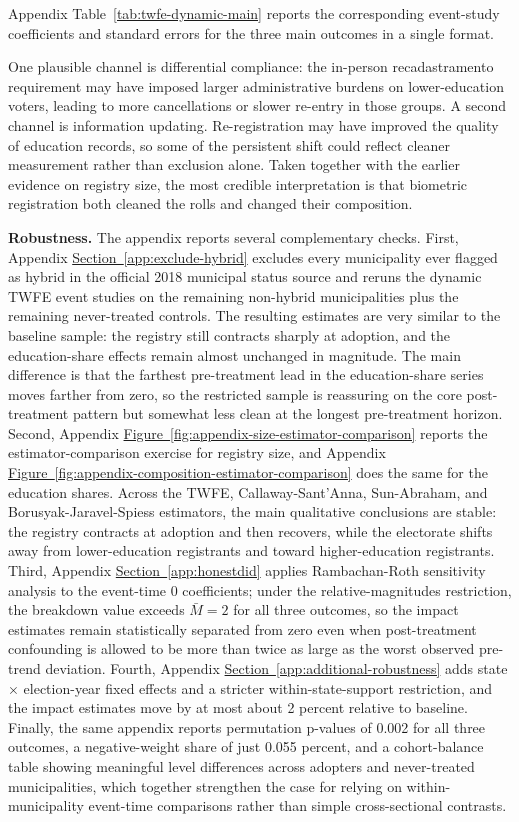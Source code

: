 Appendix Table~\ref{tab:twfe-dynamic-main} reports the corresponding event-study coefficients and standard errors for the three main outcomes in a single format.

One plausible channel is differential compliance: the in-person recadastramento requirement may have imposed larger administrative burdens on lower-education voters, leading to more cancellations or slower re-entry in those groups. A second channel is information updating. Re-registration may have improved the quality of education records, so some of the persistent shift could reflect cleaner measurement rather than exclusion alone. Taken together with the earlier evidence on registry size, the most credible interpretation is that biometric registration both cleaned the rolls and changed their composition.

\textbf{Robustness.} The appendix reports several complementary checks. First, Appendix \hyperref[app:exclude-hybrid]{Section~\ref*{app:exclude-hybrid}} excludes every municipality ever flagged as hybrid in the official 2018 municipal status source and reruns the dynamic TWFE event studies on the remaining non-hybrid municipalities plus the remaining never-treated controls. The resulting estimates are very similar to the baseline sample: the registry still contracts sharply at adoption, and the education-share effects remain almost unchanged in magnitude. The main difference is that the farthest pre-treatment lead in the education-share series moves farther from zero, so the restricted sample is reassuring on the core post-treatment pattern but somewhat less clean at the longest pre-treatment horizon. Second, Appendix \hyperref[fig:appendix-size-estimator-comparison]{Figure~\ref*{fig:appendix-size-estimator-comparison}} reports the estimator-comparison exercise for registry size, and Appendix \hyperref[fig:appendix-composition-estimator-comparison]{Figure~\ref*{fig:appendix-composition-estimator-comparison}} does the same for the education shares. Across the TWFE, Callaway-Sant'Anna, Sun-Abraham, and Borusyak-Jaravel-Spiess estimators, the main qualitative conclusions are stable: the registry contracts at adoption and then recovers, while the electorate shifts away from lower-education registrants and toward higher-education registrants. Third, Appendix \hyperref[app:honestdid]{Section~\ref*{app:honestdid}} applies Rambachan-Roth sensitivity analysis to the event-time $0$ coefficients; under the relative-magnitudes restriction, the breakdown value exceeds $\bar{M}=2$ for all three outcomes, so the impact estimates remain statistically separated from zero even when post-treatment confounding is allowed to be more than twice as large as the worst observed pre-trend deviation. Fourth, Appendix \hyperref[app:additional-robustness]{Section~\ref*{app:additional-robustness}} adds state $\times$ election-year fixed effects and a stricter within-state-support restriction, and the impact estimates move by at most about 2 percent relative to baseline. Finally, the same appendix reports permutation p-values of 0.002 for all three outcomes, a negative-weight share of just 0.055 percent, and a cohort-balance table showing meaningful level differences across adopters and never-treated municipalities, which together strengthen the case for relying on within-municipality event-time comparisons rather than simple cross-sectional contrasts.
